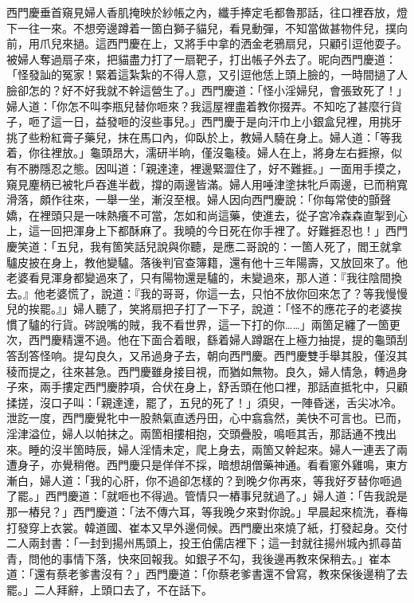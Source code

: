 西門慶垂首窺見婦人香肌掩映於紗帳之內，纖手捧定毛都魯那話，往口裡吞放，燈下一往一來。不想旁邊蹲着一箇白獅子貓兒，看見動彈，不知當做甚物件兒，撲向前，用爪兒來撾。{}這西門慶在上，又將手中拿的洒金老鴉扇兒，只顧引逗他耍子。被婦人奪過扇子來，把貓盡力打了一扇靶子，打出帳子外去了。昵向西門慶道：「怪發訕的冤家！緊着這紮紮的不得人意，又引逗他恁上頭上臉的，一時間撾了人臉卻怎的？好不好我就不幹這營生了。」西門慶道：「怪小淫婦兒，會張致死了！」婦人道：「你怎不叫李瓶兒替你咂來？我這屋裡盡着教你掇弄。不知吃了甚麼行貨子，咂了這一日，益發咂的沒些事兒。」西門慶于是向汗巾上小銀盒兒裡，用挑牙挑了些粉紅膏子藥兒，抹在馬口內，仰臥於上，教婦人騎在身上。婦人道：「等我𢵞着，你往裡放。」龜頭昂大，濡研半晌，僅沒龜稜。婦人在上，將身左右捱擦，似有不勝隱忍之態。因叫道：「親達達，裡邊緊澀住了，好不難捱。」一面用手摸之，窺見麈柄已被牝戶吞進半截，撐的兩邊皆滿。婦人用唾津塗抹牝戶兩邊，已而稍寬滑落，頗作往來，一舉一坐，漸沒至根。婦人因向西門慶說：「你每常使的顫聲嬌，在裡頭只是一味熱癢不可當，怎如和尚這藥，使進去，從子宮冷森森直掣到心上，這一回把渾身上下都酥麻了。我曉的今日死在你手裡了。好難捱忍也！」{}西門慶笑道：「五兒，我有箇笑話兒說與你聽，是應二哥說的：一箇人死了，閻王就拿驢皮披在身上，教他變驢。落後判官查簿籍，還有他十三年陽壽，又放回來了。他老婆看見渾身都變過來了，只有陽物還是驢的，未變過來，那人道：『我往陰間換去。』他老婆慌了，說道：『我的哥哥，你這一去，只怕不放你回來怎了？等我慢慢兒的挨罷。』」婦人聽了，笑將扇把子打了一下子，說道：「怪不的應花子的老婆挨慣了驢的行貨。硶說嘴的賊，我不看世界，這一下打的你……」兩箇足纏了一箇更次，西門慶精還不過。他在下面合着眼，繇着婦人蹲踞在上極力抽提，提的龜頭刮答刮答怪响。提勾良久，又吊過身子去，朝向西門慶。西門慶雙手舉其股，僅沒其稜而提之，往來甚急。西門慶雖身接目視，而猶如無物。良久，婦人情急，轉過身子來，兩手摟定西門慶脖項，合伏在身上，舒舌頭在他口裡，那話直抵牝中，只顧揉搓，沒口子叫：「親達達，罷了，五兒的死了！」須臾，一陣昏迷，舌尖冰冷。泄訖一度，西門慶覺牝中一股熱氣直透丹田，心中翕翕然，美快不可言也。已而，淫津溢位，婦人以帕抹之。兩箇相摟相抱，交頭疊股，鳴咂其舌，那話通不拽出來。睡的沒半箇時辰，婦人淫情未定，爬上身去，兩箇又幹起來。婦人一連丟了兩遭身子，亦覺稍倦。西門慶只是佯佯不採，暗想胡僧藥神通。看看窻外雞鳴，東方漸白，婦人道：「我的心肝，你不過卻怎樣的？到晚夕你再來，等我好歹替你咂過了罷。」西門慶道：「就咂也不得過。管情只一樁事兒就過了。」婦人道：「告我說是那一樁兒？」西門慶道：「法不傳六耳，等我晚夕來對你說。」早晨起來梳洗，春梅打發穿上衣裳。韓道國、崔本又早外邊伺候。西門慶出來燒了紙，打發起身。交付二人兩封書：「一封到揚州馬頭上，投王伯儒店裡下；這一封就往揚州城內抓尋苗青，問他的事情下落，快來回報我。如銀子不勾，我後邊再教來保稍去。」崔本道：「還有蔡老爹書沒有？」西門慶道：「你蔡老爹書還不曾寫，教來保後邊稍了去罷。」二人拜辭，上頭口去了，不在話下。

